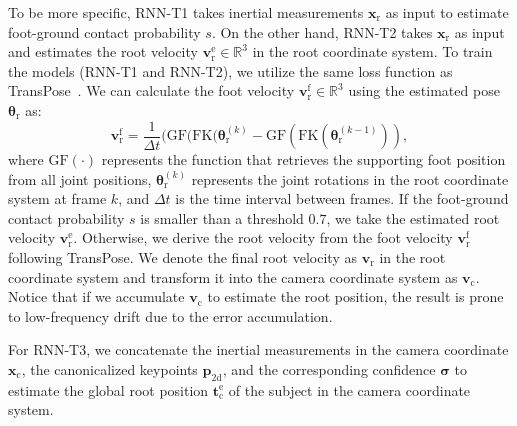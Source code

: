 %
\par
To be more specific, RNN-T1 takes inertial measurements $\boldsymbol{x}_{\mathrm{r}}$ as input to estimate foot-ground contact probability $s$.
%
On the other hand, RNN-T2 takes $\boldsymbol{x}_{\mathrm{r}}$ as input and estimates the root velocity $\boldsymbol{{v}_{\mathrm{r}}^{\mathrm{e}}}\in\mathbb{R}^{3}$ in the root coordinate system.
%
To train the models (RNN-T1 and RNN-T2), we utilize the same loss function as TransPose~\cite{TransPose}.
%
We can calculate the foot velocity $\boldsymbol{v}_{\mathrm{r}}^\mathrm{f}\in\mathbb{R}^{3}$ using the estimated pose $\boldsymbol{\theta}_{\mathrm{r}}$ as:
\begin{equation}
\boldsymbol{v}_{\mathrm{r}}^\mathrm{f}=\frac{1}{\Delta t}(\mathrm{GF}(\mathrm{FK}(\boldsymbol{\theta}_{\mathrm{r}}^{(k)}-\mathrm{GF}(\mathrm{FK}(\boldsymbol{\theta}_{\mathrm{r}}^{(k-1)})),
\end{equation}
where $\mathrm{GF}(\cdot)$ represents the function that retrieves the supporting foot position from all joint positions, $\boldsymbol{\theta}_{\mathrm{r}}^{(k)}$ represents the joint rotations in the root coordinate system at frame $k$, and $\Delta t$ is the time interval between frames.
%
%
If the foot-ground contact probability $s$ is smaller than a threshold $0.7$, we take the estimated root velocity $\boldsymbol{{v}_{\mathrm{r}}^{\mathrm{e}}}$.
%
Otherwise, we derive the root velocity from the foot velocity $\boldsymbol{v}_{\mathrm{r}}^\mathrm{f}$ following TransPose.
%
We denote the final root velocity as  $\boldsymbol{{v}_{\mathrm{r}}}$ in the root coordinate system and transform it into the camera coordinate system as $\boldsymbol{{v}_{\mathrm{c}}}$.
Notice that if we accumulate $\boldsymbol{{v}_{\mathrm{c}}}$ to estimate the root position, the result is prone to low-frequency drift due to the error accumulation.
%
\par
For RNN-T3, we concatenate the inertial measurements in the camera coordinate $\boldsymbol{x}_{\mathrm{c}}$, the canonicalized keypoints $\boldsymbol{p}_{\mathrm{2d}}$, and the corresponding confidence $\boldsymbol{\sigma}$ to estimate the global root position $\boldsymbol{t}_{\mathrm{c}}^{\mathrm{e}}$ of the subject in the camera coordinate system. 
